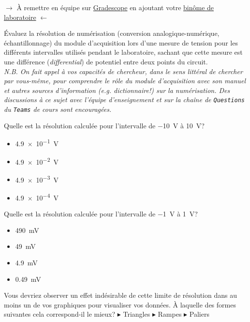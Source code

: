 \documentclass[canadien,12pt,oneside,letterpaper]{article}
\begin{document}
\vspace{-0.5cm}
\noindent$\rightarrow$ À remettre en équipe sur \href{https://www.gradescope.com/}{Gradescope} en ajoutant votre \href{https://help.gradescope.com/article/m5qz2xsnjy-student-add-group-members}{binôme de laboratoire} $\leftarrow$

\begin{gradescope}
\item Évaluez la résolution de numérisation (conversion analogique-numérique, échantillonnage) du module d'acquisition lors d'une mesure de tension pour les différents intervalles utilisés pendant le laboratoire, sachant que cette mesure est une différence (\textit{differential}) de potentiel entre deux points du circuit.\\ \textit{\footnotesize N.B. On fait appel à vos capacités de chercheur, dans le sens littéral de chercher par vous-même, pour comprendre le rôle du module d'acquisition avec son manuel et autres sources d'information (\emph{e.g.} dictionnaire!) sur la numérisation. Des discussions à ce sujet avec l'équipe d'enseignement et sur la chaîne de \texttt{Questions} du \texttt{Teams} de cours sont encouragées.}
    \begin{gradescope}
    \item Quelle est la résolution calculée pour l'intervalle de \qty{-10}{\volt} à \qty{10}{\volt}?
        \begin{itemize}[label=$\blacktriangleright$]
        \item \qty{4.9e-1}{\volt}
        \item \qty{4.9e-2}{\volt}
        \item \qty{4.9e-3}{\volt}
        \item \qty{4.9e-4}{\volt}
        \end{itemize}
    \item Quelle est la résolution calculée pour l'intervalle de \qty{-1}{\volt} à \qty{1}{\volt}?
        \begin{itemize}[label=$\blacktriangleright$]
        \item \qty{490}{\mV}
        \item \qty{49}{\mV}
        \item \qty{4.9}{\mV}
        \item \qty{0.49}{\mV}
        \end{itemize}
    \item Vous devriez observer un effet indésirable de cette limite de résolution dans au moins un de vos graphiques pour visualiser vos données. À laquelle des formes suivantes cela correspond-il le mieux? $\blacktriangleright$ Triangles $\blacktriangleright$ Rampes $\blacktriangleright$ Paliers %

\end{gradescope}
\end{gradescope}
\end{document}
